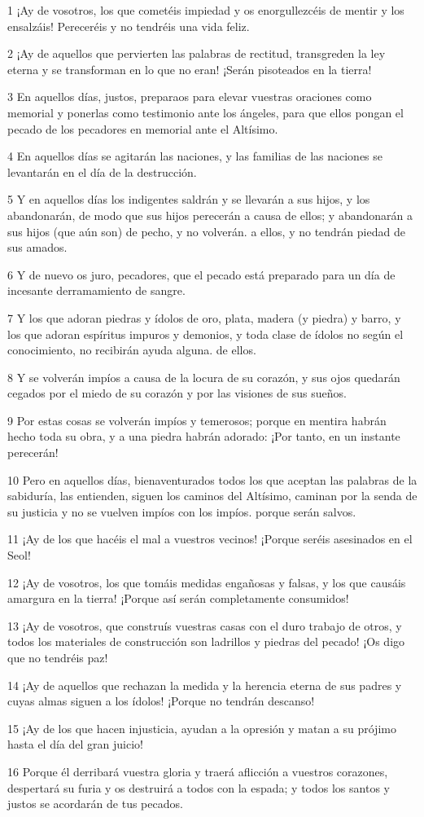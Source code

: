 \par 1 ¡Ay de vosotros, los que cometéis impiedad y os enorgullezcéis de mentir y los ensalzáis! Pereceréis y no tendréis una vida feliz.
\par 2 ¡Ay de aquellos que pervierten las palabras de rectitud, transgreden la ley eterna y se transforman en lo que no eran! ¡Serán pisoteados en la tierra!
\par 3 En aquellos días, justos, preparaos para elevar vuestras oraciones como memorial y ponerlas como testimonio ante los ángeles, para que ellos pongan el pecado de los pecadores en memorial ante el Altísimo.
\par 4 En aquellos días se agitarán las naciones, y las familias de las naciones se levantarán en el día de la destrucción.
\par 5 Y en aquellos días los indigentes saldrán y se llevarán a sus hijos, y los abandonarán, de modo que sus hijos perecerán a causa de ellos; y abandonarán a sus hijos (que aún son) de pecho, y no volverán. a ellos, y no tendrán piedad de sus amados.
\par 6 Y de nuevo os juro, pecadores, que el pecado está preparado para un día de incesante derramamiento de sangre.
\par 7 Y los que adoran piedras y ídolos de oro, plata, madera (y piedra) y barro, y los que adoran espíritus impuros y demonios, y toda clase de ídolos no según el conocimiento, no recibirán ayuda alguna. de ellos.
\par 8 Y se volverán impíos a causa de la locura de su corazón, y sus ojos quedarán cegados por el miedo de su corazón y por las visiones de sus sueños.
\par 9 Por estas cosas se volverán impíos y temerosos; porque en mentira habrán hecho toda su obra, y a una piedra habrán adorado: ¡Por tanto, en un instante perecerán!
\par 10 Pero en aquellos días, bienaventurados todos los que aceptan las palabras de la sabiduría, las entienden, siguen los caminos del Altísimo, caminan por la senda de su justicia y no se vuelven impíos con los impíos. porque serán salvos.
\par 11 ¡Ay de los que hacéis el mal a vuestros vecinos! ¡Porque seréis asesinados en el Seol!
\par 12 ¡Ay de vosotros, los que tomáis medidas engañosas y falsas, y los que causáis amargura en la tierra! ¡Porque así serán completamente consumidos!
\par 13 ¡Ay de vosotros, que construís vuestras casas con el duro trabajo de otros, y todos los materiales de construcción son ladrillos y piedras del pecado! ¡Os digo que no tendréis paz!
\par 14 ¡Ay de aquellos que rechazan la medida y la herencia eterna de sus padres y cuyas almas siguen a los ídolos! ¡Porque no tendrán descanso!
\par 15 ¡Ay de los que hacen injusticia, ayudan a la opresión y matan a su prójimo hasta el día del gran juicio!
\par 16 Porque él derribará vuestra gloria y traerá aflicción a vuestros corazones, despertará su furia y os destruirá a todos con la espada; y todos los santos y justos se acordarán de tus pecados.


